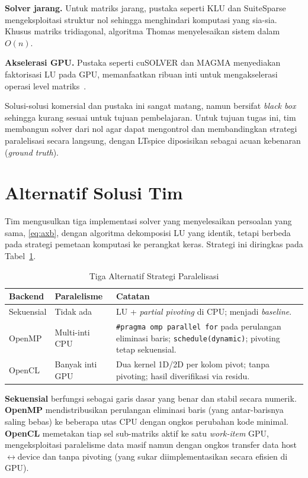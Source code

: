 \documentclass[conference]{IEEEtran}
\begin{document}
\textbf{Solver jarang.} Untuk matriks jarang, pustaka seperti KLU dan SuiteSparse~\cite{davis2010klu} mengeksploitasi struktur nol sehingga menghindari komputasi yang sia-sia. Khusus matriks tridiagonal, algoritma Thomas menyelesaikan sistem dalam $O(n)$.

\textbf{Akselerasi GPU.} Pustaka seperti cuSOLVER dan MAGMA menyediakan faktorisasi LU pada GPU, memanfaatkan ribuan inti untuk mengakselerasi operasi level matriks~\cite{stone2010opencl}.

Solusi-solusi komersial dan pustaka ini sangat matang, namun bersifat \emph{black box} sehingga kurang sesuai untuk tujuan pembelajaran. Untuk tujuan tugas ini, tim membangun solver dari nol agar dapat mengontrol dan membandingkan strategi paralelisasi secara langsung, dengan LTspice diposisikan sebagai acuan kebenaran (\emph{ground truth}).

\section{Alternatif Solusi Tim}
Tim mengusulkan tiga implementasi solver yang menyelesaikan persoalan yang sama, \eqref{eq:axb}, dengan algoritma dekomposisi LU yang identik, tetapi berbeda pada strategi pemetaan komputasi ke perangkat keras. Strategi ini diringkas pada Tabel~\ref{tab:strategi}.

\begin{table}[t]
\caption{Tiga Alternatif Strategi Paralelisasi}
\label{tab:strategi}
\centering
\renewcommand{\arraystretch}{1.25}
\begin{tabular}{@{}p{1.45cm}p{2.0cm}p{3.5cm}@{}}
\toprule
\textbf{Backend} & \textbf{Paralelisme} & \textbf{Catatan} \\
\midrule
Sekuensial & Tidak ada & LU + \emph{partial pivoting} di CPU; menjadi \emph{baseline}. \\
OpenMP & Multi-inti CPU & \texttt{\#pragma omp parallel for} pada perulangan eliminasi baris; \texttt{schedule(dynamic)}; pivoting tetap sekuensial. \\
OpenCL & Banyak inti GPU & Dua kernel 1D/2D per kolom pivot; tanpa pivoting; hasil diverifikasi via residu. \\
\bottomrule
\end{tabular}
\end{table}

\textbf{Sekuensial} berfungsi sebagai garis dasar yang benar dan stabil secara numerik. \textbf{OpenMP} mendistribusikan perulangan eliminasi baris (yang antar-barisnya saling bebas) ke beberapa utas CPU dengan ongkos perubahan kode minimal. \textbf{OpenCL} memetakan tiap sel sub-matriks aktif ke satu \emph{work-item} GPU, mengeksploitasi paralelisme data masif namun dengan ongkos transfer data host$\leftrightarrow$device dan tanpa pivoting (yang sukar diimplementasikan secara efisien di GPU).
\end{document}
